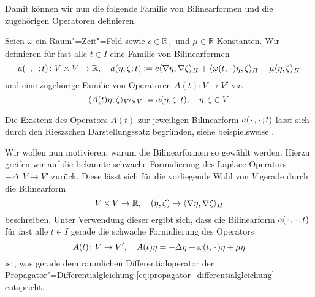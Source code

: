 \documentclass[../main.tex]{subfiles}
\begin{document}
Damit können wir nun die folgende Familie von Bilinearformen und die zugehörigen Operatoren definieren.

\begin{Definition}
\label{definition:operator_bilinearform_zeit}
    Seien $\omega$ ein Raum"=Zeit"=Feld sowie $c \in \mathbb{R}_{+}$ und $\mu \in \mathbb{R}$ Konstanten.
    Wir definieren für fast alle $t \in I$ eine Familie von Bilinearformen
    \begin{equation}
        \label{eq:bilinearform_zeit}
        a({\mkern2mu\cdot\mkern2mu}, {\mkern2mu\cdot\mkern2mu}; t) \colon V \times V \to \mathbb{R}, \quad  a(\eta, \zeta; t) := c\langle\nabla \eta,\nabla \zeta\rangle_{H} + \langle\omega(t, {\mkern2mu\cdot\mkern2mu}) \eta,\zeta\rangle_{H} + \mu \langle\eta,\zeta\rangle_{H}
    \end{equation}
    und eine zugehörige Familie von Operatoren $A(t) \colon V \to V'$ via
    \begin{equation}
        \label{eq:operator_zeit}
        \langle A(t)\eta,\zeta\rangle_{V' \times V} := a(\eta, \zeta; t), \quad \eta, \zeta \in V.
    \end{equation}
\end{Definition}

\begin{Bemerkung}
\label{bemerkung:operator_bilinearform_riesz}
    Die Existenz des Operators $A(t)$ zur jeweiligen Bilinearform $a({\mkern2mu\cdot\mkern2mu}, {\mkern2mu\cdot\mkern2mu}; t)$ lässt sich durch den Rieszschen Darstellungssatz begründen, siehe beispielsweise \cite[Theorem \S{}22.1]{Halmos:1957vd}.
\end{Bemerkung}

Wir wollen nun motivieren, warum die Bilinearformen so gewählt werden.
Hierzu greifen wir auf die bekannte schwache Formulierung des Laplace-Operators $- \Delta \colon V \to V'$ zurück.
Diese lässt sich für die vorliegende Wahl von $V$ gerade durch die Bilinearform
\begin{equation}
    V \times V \to \mathbb{R}, \quad (\eta, \zeta) \mapsto \langle\nabla \eta,\nabla \zeta\rangle_{H}
\end{equation}
beschreiben.
Unter Verwendung dieser ergibt sich, dass die Bilinearform $a({\mkern2mu\cdot\mkern2mu}, {\mkern2mu\cdot\mkern2mu}; t)$ für fast alle $t \in I$ gerade die schwache Formulierung des Operators
\begin{equation}
    A(t) \colon V \to V', \quad A(t)\eta = - \Delta \eta + \omega(t, {\mkern2mu\cdot\mkern2mu}) \eta + \mu \eta
\end{equation}
ist, was gerade dem räumlichen Differentialoperator der Propagator"=Differentialgleichung \cref{eq:propagator_differentialgleichung} entspricht.
\end{document}
